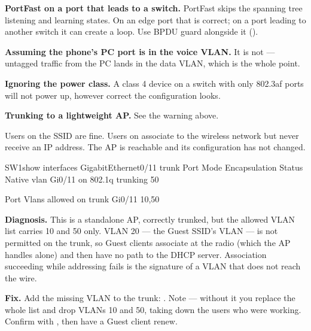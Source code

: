 \begin{pitfall}
\begin{tight}
  \item \textbf{PortFast on a port that leads to a switch.} PortFast skips the
        spanning tree listening and learning states. On an edge port that is
        correct; on a port leading to another switch it can create a loop. Use
        BPDU guard alongside it ().
  \item \textbf{Assuming the phone's PC port is in the voice VLAN.} It is not ---
        untagged traffic from the PC lands in the data VLAN, which is the whole
        point.
  \item \textbf{Ignoring the power class.} A class 4 device on a switch with only
        802.3af ports will not power up, however correct the configuration looks.
  \item \textbf{Trunking to a lightweight AP.} See the warning above.
\end{tight}
\end{pitfall}

\begin{breakfix}
Users on the  SSID are fine. Users on  associate to the
wireless network but never receive an IP address. The AP is reachable and its
configuration has not changed.

\begin{verify}{SW1}{show interfaces GigabitEthernet0/11 trunk}
Port        Mode         Encapsulation  Status        Native vlan
Gi0/11      on           802.1q         trunking      50

Port        Vlans allowed on trunk
Gi0/11      10,50
\end{verify}

\textbf{Diagnosis.} This is a standalone AP, correctly trunked, but the allowed
VLAN list carries 10 and 50 only. VLAN 20 --- the Guest SSID's VLAN --- is not
permitted on the trunk, so Guest clients associate at the radio (which the AP
handles alone) and then have no path to the DHCP server. Association succeeding
while addressing fails is the signature of a VLAN that does not reach the wire.

\textbf{Fix.} Add the missing VLAN to the trunk:
. Note  --- without it you
replace the whole list and drop VLANs 10 and 50, taking down the users who were
working. Confirm with , then have a Guest client
renew.
\end{breakfix}

